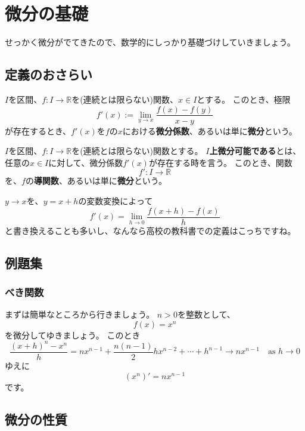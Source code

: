 \chapter{微分の基礎}

せっかく微分がでてきたので、数学的にしっかり基礎づけしていきましょう。



\section{定義のおさらい}

\begin{definition}
  $I$を区間、$f:I\to\mathbb{R}$を(連続とは限らない)関数、$x\in I$とする。
  このとき、極限
  \[
    f'(x):=\lim_{y\to x}\frac{f(x)-f(y)}{x-y}
  \]
  が存在するとき、$f'(x)$を$f$の$x$における\textbf{微分係数}、あるいは単に\textbf{微分}という。
\end{definition}

\begin{definition}
  $I$を区間、$f:I\to\mathbb{R}$を(連続とは限らない)関数とする。
  \textbf{$I$上微分可能である}とは、任意の$x\in I$に対して、微分係数$f'(x)$が存在する時を言う。
  このとき、関数
  \[
    f':I\to\mathbb{R}
  \]
  を、$f$の\textbf{導関数}、あるいは単に\textbf{微分}という。
\end{definition}

$y\to x$を、$y=x+h$の変数変換によって
\[
  f'(x)=\lim_{h\to0}\frac{f(x+h)-f(x)}{h}
\]
と書き換えることも多いし、なんなら高校の教科書での定義はこっちですね。



\section{例題集}

\subsection{べき関数}

まずは簡単なところから行きましょう。
$n>0$を整数として、
\[
  f(x)=x^n
\]
を微分してゆきましょう。
このとき
\[
  \frac{(x+h)^n-x^n}{h}=nx^{n-1}+\frac{n(n-1)}{2}hx^{n-2}+\cdots+h^{n-1}\to nx^{n-1}\quad\text{as }h\to 0
\]
ゆえに
\[
  (x^n)'=nx^{n-1}
\]
です。



\section{微分の性質}

